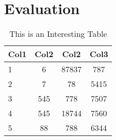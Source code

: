 \chapter{Evaluation}
\Blindtext[5][2]

\begin{table}
	\centering
	 \begin{tabular}{l c c c} 
	 \toprule
	 \textbf{Col1} & \textbf{Col2} & \textbf{Col2} & \textbf{Col3} \\
	 \midrule
	 1 & 6 & 87837 & 787 \\ 
	 2 & 7 & 78 & 5415 \\
	 3 & 545 & 778 & 7507 \\
	 4 & 545 & 18744 & 7560 \\
	 5 & 88 & 788 & 6344 \\ [1ex] 
	 \bottomrule
	\end{tabular}
	\caption{This is an Interesting Table}
	\label{tab:myTab}
\end{table}

\Blindtext[5][2]
